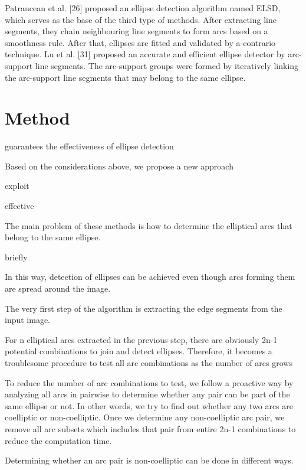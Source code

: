 \documentclass[a4paper]{report}
\begin{document}
Patraucean et al. [26] proposed an ellipse detection algorithm named ELSD, which serves as the base of the third type of methods. After extracting line segments, they chain neighbouring line segments to form arcs based on a smoothness rule. After that, ellipses are fitted and validated by a-contrario technique.  
Lu et al. [31] proposed an accurate and efficient ellipse detector by arc-support line segments. The arc-support groups were formed by iteratively linking the arc-support line segments that may belong to the same ellipse. 





\section{Method}

guarantees the effectiveness of ellipse detection

Based on the considerations above, we propose a new approach

exploit


effective

The main problem of
these methods is how to determine the elliptical arcs that
belong to the same ellipse.

briefly

In this way, detection of ellipses can be achieved even though arcs forming them are spread around the image.

The very first step of the algorithm is extracting the edge segments from the input image.

For n elliptical arcs extracted in the previous step, there are obviously 2n-1 potential combinations to join and detect ellipses.
Therefore, it becomes a troublesome procedure to test all arc combinations as the number of arcs grows

To reduce the number of arc combinations to test, we follow a proactive way by analyzing all arcs in pairwise to determine whether any pair can be part of the same ellipse or not. In other words, we try to find out whether any
two arcs are coelliptic or non-coelliptic. Once we determine any non-coelliptic arc pair, we remove all arc subsets which includes that pair from entire 2n-1 combinations to reduce the computation time.

Determining whether an arc pair is non-coelliptic can be done in different ways.
\end{document}
